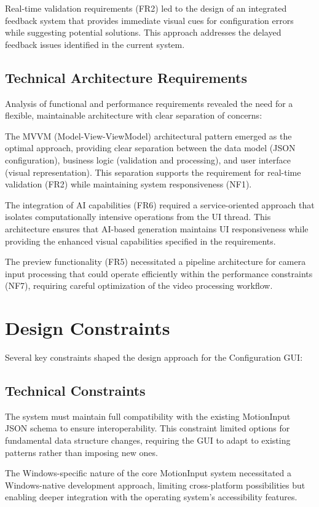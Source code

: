 Real-time validation requirements (FR2) led to the design of an integrated feedback system that provides immediate visual cues for configuration errors while suggesting potential solutions. This approach addresses the delayed feedback issues identified in the current system.

\subsection{Technical Architecture Requirements}
Analysis of functional and performance requirements revealed the need for a flexible, maintainable architecture with clear separation of concerns:

The MVVM (Model-View-ViewModel) architectural pattern emerged as the optimal approach, providing clear separation between the data model (JSON configuration), business logic (validation and processing), and user interface (visual representation). This separation supports the requirement for real-time validation (FR2) while maintaining system responsiveness (NF1).

The integration of AI capabilities (FR6) required a service-oriented approach that isolates computationally intensive operations from the UI thread. This architecture ensures that AI-based generation maintains UI responsiveness while providing the enhanced visual capabilities specified in the requirements.

The preview functionality (FR5) necessitated a pipeline architecture for camera input processing that could operate efficiently within the performance constraints (NF7), requiring careful optimization of the video processing workflow.

\section{Design Constraints}
Several key constraints shaped the design approach for the Configuration GUI:

\subsection{Technical Constraints}
The system must maintain full compatibility with the existing MotionInput JSON schema to ensure interoperability. This constraint limited options for fundamental data structure changes, requiring the GUI to adapt to existing patterns rather than imposing new ones.

The Windows-specific nature of the core MotionInput system necessitated a Windows-native development approach, limiting cross-platform possibilities but enabling deeper integration with the operating system's accessibility features.

